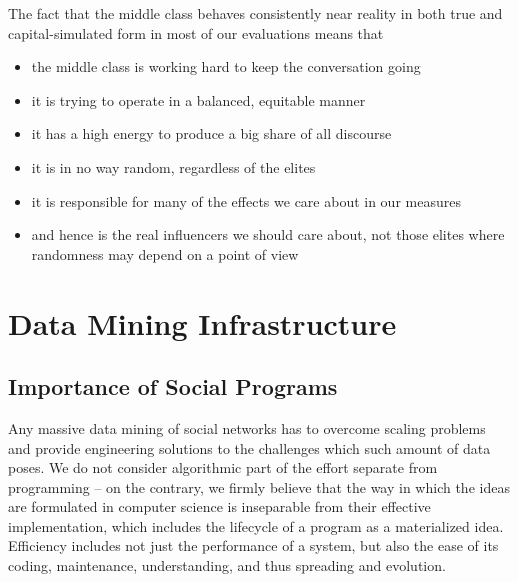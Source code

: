 \documentclass[10pt,oneside]{memoir}
\begin{document}
\begin{Spacing}{2}
The fact that the middle class behaves consistently near reality in both true and capital-simulated form in most of our evaluations means that


\begin{itemize}


\item the middle class is working hard to keep the conversation going

\item it is trying to operate in a balanced, equitable manner

\item it has a high energy to produce a big share of all discourse

\item it is in no way random, regardless of the elites

\item it is responsible for many of the effects we care about in our measures

\item and hence is the real influencers we should care about, not those elites where randomness may depend on a point of view
\end{itemize}

\pagebreak \chapter{Data Mining Infrastructure}
\label{datamininginfrastructure}

\label{chapter:datamining-infrastructure}


\section{Importance of Social Programs}
\label{importanceofsocialprograms}

Any massive data mining of social networks has to overcome scaling problems and provide engineering solutions to the challenges which such amount of data poses.  We do not consider algorithmic part of the effort separate from programming -- on the contrary, we firmly believe that the way in which the ideas are formulated in computer science is inseparable from their effective implementation, which includes the lifecycle of a program as a materialized idea.  Efficiency includes not just the performance of a system, but also the ease of its coding, maintenance, understanding, and thus spreading and evolution.



\end{Spacing}
\end{document}
